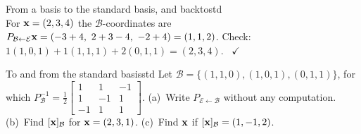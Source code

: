 \documentclass[11pt]{article}
\begin{document}
\begin{exmp}{From a basis to the standard basis, and back}{tostd}
\[\]
For $\mathbf{x}=(2,3,4)$ the $\mathcal{B}$-coordinates are $P_{\mathcal{B}\leftarrow\mathcal{E}}\bv{x}=(-3+4,\ 2+3-4,\ -2+4)=(1,1,2)$. Check: $1(1,0,1)+1(1,1,1)+2(0,1,1)=(2,3,4)$. \ $\checkmark$
\end{exmp}

\begin{kc}{To and from the standard basis}{std}
Let $\mathcal{B}=\{(1,1,0),(1,0,1),(0,1,1)\}$, for which $P_{\mathcal{B}}^{-1}=\tfrac12\begin{bmatrix}1&1&-1\\1&-1&1\\-1&1&1\end{bmatrix}$. (a)~Write $P_{\mathcal{E}\leftarrow\mathcal{B}}$ without any computation. (b)~Find $[\mathbf{x}]_{\mathcal{B}}$ for $\mathbf{x}=(2,3,1)$. (c)~Find $\mathbf{x}$ if $[\mathbf{x}]_{\mathcal{B}}=(1,-1,2)$.
\end{kc}
\end{document}
